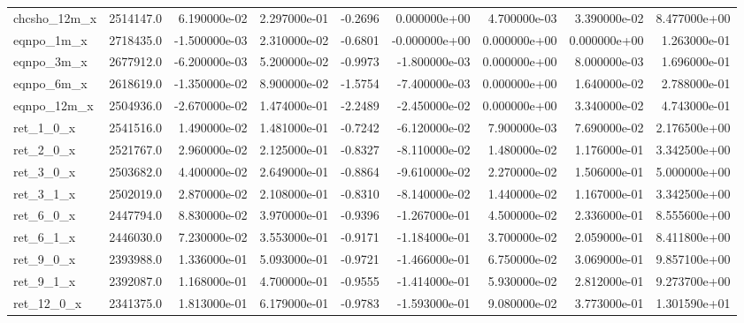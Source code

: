 \documentclass[12pt]{article}
\begin{document}
\begin{landscape}
\begin{longtable}{|l|r|r|r|r|r|r|r|r|}
chcsho\_12m\_x            &  2514147.0 &  6.190000e-02 &  2.297000e-01 &     -0.2696 &  0.000000e+00 &  4.700000e-03 &  3.390000e-02 &  8.477000e+00 \\
eqnpo\_1m\_x              &  2718435.0 & -1.500000e-03 &  2.310000e-02 &     -0.6801 & -0.000000e+00 &  0.000000e+00 &  0.000000e+00 &  1.263000e-01 \\
eqnpo\_3m\_x              &  2677912.0 & -6.200000e-03 &  5.200000e-02 &     -0.9973 & -1.800000e-03 &  0.000000e+00 &  8.000000e-03 &  1.696000e-01 \\
eqnpo\_6m\_x              &  2618619.0 & -1.350000e-02 &  8.900000e-02 &     -1.5754 & -7.400000e-03 &  0.000000e+00 &  1.640000e-02 &  2.788000e-01 \\
eqnpo\_12m\_x             &  2504936.0 & -2.670000e-02 &  1.474000e-01 &     -2.2489 & -2.450000e-02 &  0.000000e+00 &  3.340000e-02 &  4.743000e-01 \\
ret\_1\_0\_x               &  2541516.0 &  1.490000e-02 &  1.481000e-01 &     -0.7242 & -6.120000e-02 &  7.900000e-03 &  7.690000e-02 &  2.176500e+00 \\
ret\_2\_0\_x               &  2521767.0 &  2.960000e-02 &  2.125000e-01 &     -0.8327 & -8.110000e-02 &  1.480000e-02 &  1.176000e-01 &  3.342500e+00 \\
ret\_3\_0\_x               &  2503682.0 &  4.400000e-02 &  2.649000e-01 &     -0.8864 & -9.610000e-02 &  2.270000e-02 &  1.506000e-01 &  5.000000e+00 \\
ret\_3\_1\_x               &  2502019.0 &  2.870000e-02 &  2.108000e-01 &     -0.8310 & -8.140000e-02 &  1.440000e-02 &  1.167000e-01 &  3.342500e+00 \\
ret\_6\_0\_x               &  2447794.0 &  8.830000e-02 &  3.970000e-01 &     -0.9396 & -1.267000e-01 &  4.500000e-02 &  2.336000e-01 &  8.555600e+00 \\
ret\_6\_1\_x               &  2446030.0 &  7.230000e-02 &  3.553000e-01 &     -0.9171 & -1.184000e-01 &  3.700000e-02 &  2.059000e-01 &  8.411800e+00 \\
ret\_9\_0\_x               &  2393988.0 &  1.336000e-01 &  5.093000e-01 &     -0.9721 & -1.466000e-01 &  6.750000e-02 &  3.069000e-01 &  9.857100e+00 \\
ret\_9\_1\_x               &  2392087.0 &  1.168000e-01 &  4.700000e-01 &     -0.9555 & -1.414000e-01 &  5.930000e-02 &  2.812000e-01 &  9.273700e+00 \\
ret\_12\_0\_x              &  2341375.0 &  1.813000e-01 &  6.179000e-01 &     -0.9783 & -1.593000e-01 &  9.080000e-02 &  3.773000e-01 &  1.301590e+01 \\

\end{longtable}
\end{landscape}
\end{document}
